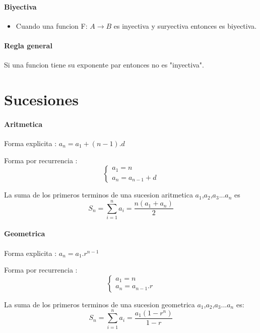 \documentclass[a4paper]{article}
\begin{document}
\paragraph{Biyectiva}
\begin{itemize}
	\item  Cuando una funcion F: $A \rightarrow B$ es inyectiva y suryectiva entonces es biyectiva. 
\end{itemize}

\paragraph{Regla general}
\begin{description}
	\item Si una funcion tiene su exponente par entonces no es "inyectiva".
\end{description}

\section{Sucesiones}

\paragraph{Aritmetica}
\begin{description}
	\item Forma explicita : $a_n = a_1 + (n-1).d$
	\item Forma por recurrencia :	\begin{equation*}
	\begin{cases}
    	     a_1 = n \\ 
    	     a_n = a_{n-1} + d                
    \end{cases}
\end{equation*}
\end{description}
	La suma de los primeros terminos de una sucesion aritmetica  $a_1$,$a_2$,$a_3$...$a_n$ es
	\begin{equation}
		S_n = \sum_{i=1}^{n}a_i =\frac{n(a_1 + a_n)}{2} 
	\end{equation}	

\paragraph{Geometrica}
\begin{description}
	\item Forma explicita : $a_n = a_1 . r^{n-1}$
	\item Forma por recurrencia : \begin{equation*}
	\begin{cases}
    	    a_1 = n \\ 
    	    a_n = a_{n-1} . r	                  
    \end{cases}
\end{equation*}
\end{description}
	La suma de los primeros terminos de una sucesion geometrica  $a_1$,$a_2$,$a_3$...$a_n$ es:
	\begin{equation}
		S_n = \sum_{i=1}^{n}a_i =\frac{a_1(1 - r^n)}{1-r} 
	\end{equation}
\end{document}
